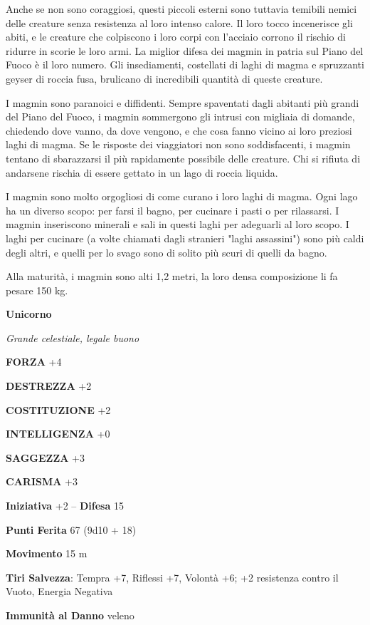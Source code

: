 \begin{multicols}{2}
	Anche se non sono coraggiosi, questi piccoli esterni sono tuttavia temibili nemici delle creature senza resistenza al loro intenso calore. Il loro tocco incenerisce gli abiti, e le creature che colpiscono i loro corpi con l'acciaio corrono il rischio di ridurre in scorie le loro armi. La miglior difesa dei magmin in patria sul Piano del Fuoco è il loro numero. Gli insediamenti, costellati di laghi di magma e spruzzanti geyser di roccia fusa, brulicano di incredibili quantità di queste creature.

	I magmin sono paranoici e diffidenti. Sempre spaventati dagli abitanti più grandi del Piano del Fuoco, i magmin sommergono gli intrusi con migliaia di domande, chiedendo dove vanno, da dove vengono, e che cosa fanno vicino ai loro preziosi laghi di magma. Se le risposte dei viaggiatori non sono soddisfacenti, i magmin tentano di sbarazzarsi il più rapidamente possibile delle creature. Chi si rifiuta di andarsene rischia di essere gettato in un lago di roccia liquida.

	I magmin sono molto orgogliosi di come curano i loro laghi di magma. Ogni lago ha un diverso scopo: per farsi il bagno, per cucinare i pasti o per rilassarsi. I magmin inseriscono minerali e sali in questi laghi per adeguarli al loro scopo. I laghi per cucinare (a volte chiamati dagli stranieri "laghi assassini") sono più caldi degli altri, e quelli per lo svago sono di solito più scuri di quelli da bagno.

	Alla maturità, i magmin sono alti 1,2 metri, la loro densa composizione li fa pesare 150 kg.

	\medskip{}\textbf{Unicorno}

	\textit{Grande celestiale, legale buono}

	\textbf{FORZA} +4

	\textbf{DESTREZZA} +2

	\textbf{COSTITUZIONE} +2

	\textbf{INTELLIGENZA} +0

	\textbf{SAGGEZZA} +3

	\textbf{CARISMA} +3

	\textbf{Iniziativa} +2 -- \textbf{Difesa} 15

	\textbf{Punti Ferita} 67 (9d10 + 18)

	\textbf{Movimento} 15 m

	\textbf{Tiri Salvezza}: Tempra +7, Riflessi +7, Volontà +6; +2 resistenza contro il Vuoto, Energia Negativa

	\textbf{Immunità al Danno} veleno


\end{multicols}
